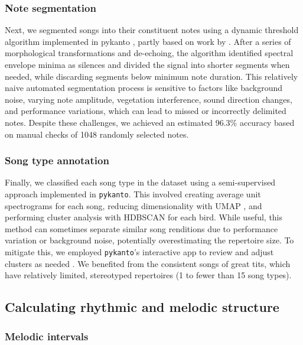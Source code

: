 \subsubsection{Note segmentation}

Next, we segmented songs into their constituent notes using a dynamic threshold algorithm implemented in pykanto \parencite{merinorecalde2023}, partly based on work by \textcite{sainburg2019}. After a series of morphological transformations and de-echoing, the algorithm identified spectral envelope minima as silences and divided the signal into shorter segments when needed, while discarding segments below minimum note duration.
This relatively naive automated segmentation process is sensitive to factors like background noise, varying note amplitude, vegetation interference, sound direction changes, and performance variations, which can lead to missed or incorrectly delimited notes. Despite these challenges, we achieved an estimated 96.3\% accuracy based on manual checks of 1048 randomly selected notes.

\subsubsection{Song type annotation}

Finally, we classified each song type in the dataset using a semi-supervised approach implemented in \texttt{pykanto}. This involved creating average unit spectrograms for each song, reducing dimensionality with UMAP \parencite{mcinnes2018}, and performing cluster analysis with HDBSCAN \parencite{mcinnes2017} for each bird. While useful, this method can sometimes separate similar song renditions due to performance variation or background noise, potentially overestimating the repertoire size. To mitigate this, we employed \texttt{pykanto}'s interactive app to review and adjust clusters as needed \cite{merinorecalde2023a}. We benefited from the consistent songs of great tits, which have relatively limited, stereotyped repertoires (1 to fewer than 15 song types).

\subsection{Calculating rhythmic and melodic structure}


\subsubsection{Melodic intervals}

